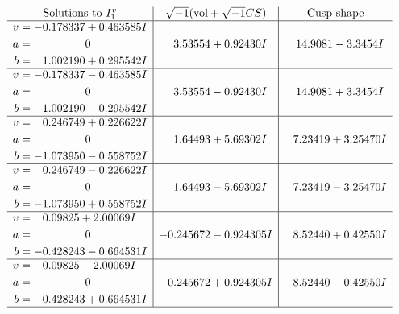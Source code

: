 \documentclass[1p]{elsarticle_modified}
\theoremstyle{definition}
\newcommand{\I}{\sqrt{-1}}
\begin{document}
$$\begin{array}{c|c|c}  
\text{Solutions to }I^v_{1}& \I (\text{vol} + \sqrt{-1}CS) & \text{Cusp shape}\\
 \hline 
\begin{aligned}
v &= -0.178337 + 0.463585 I \\
a &= \phantom{-0.000000 } 0 \\
b &= \phantom{-}1.002190 + 0.295542 I\end{aligned}
 & \phantom{-}3.53554 + 0.92430 I & \phantom{-}14.9081 - 3.3454 I \\ \hline\begin{aligned}
v &= -0.178337 - 0.463585 I \\
a &= \phantom{-0.000000 } 0 \\
b &= \phantom{-}1.002190 - 0.295542 I\end{aligned}
 & \phantom{-}3.53554 - 0.92430 I & \phantom{-}14.9081 + 3.3454 I \\ \hline\begin{aligned}
v &= \phantom{-}0.246749 + 0.226622 I \\
a &= \phantom{-0.000000 } 0 \\
b &= -1.073950 - 0.558752 I\end{aligned}
 & \phantom{-}1.64493 + 5.69302 I & \phantom{-}7.23419 + 3.25470 I \\ \hline\begin{aligned}
v &= \phantom{-}0.246749 - 0.226622 I \\
a &= \phantom{-0.000000 } 0 \\
b &= -1.073950 + 0.558752 I\end{aligned}
 & \phantom{-}1.64493 - 5.69302 I & \phantom{-}7.23419 - 3.25470 I \\ \hline\begin{aligned}
v &= \phantom{-}0.09825 + 2.00069 I \\
a &= \phantom{-0.000000 } 0 \\
b &= -0.428243 - 0.664531 I\end{aligned}
 & -0.245672 - 0.924305 I & \phantom{-}8.52440 + 0.42550 I \\ \hline\begin{aligned}
v &= \phantom{-}0.09825 - 2.00069 I \\
a &= \phantom{-0.000000 } 0 \\
b &= -0.428243 + 0.664531 I\end{aligned}
 & -0.245672 + 0.924305 I & \phantom{-}8.52440 - 0.42550 I\\
 \hline 
 \end{array}$$\newpage
\end{document}
